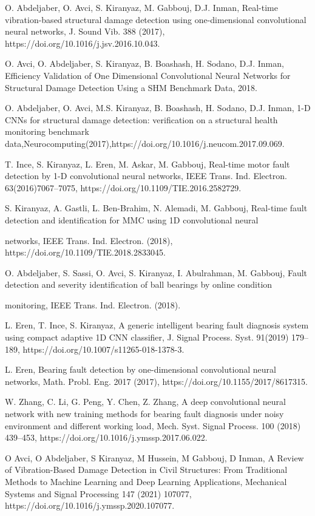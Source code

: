 \documentclass[15pt]{article}
\begin{document}
\begin{thebibliography}{99}
 O. Abdeljaber, O. Avci, S. Kiranyaz, M. Gabbouj, D.J. Inman, Real-time vibration-based structural damage detection using one-dimensional convolutional neural networks, J. Sound Vib. 388 (2017), https://doi.org/10.1016/j.jsv.2016.10.043.

 O. Avci, O. Abdeljaber, S. Kiranyaz, B. Boashash, H. Sodano, D.J. Inman, Efficiency Validation of One Dimensional Convolutional Neural Networks for Structural Damage Detection Using a SHM Benchmark Data, 2018.

 O. Abdeljaber, O. Avci, M.S. Kiranyaz, B. Boashash, H. Sodano, D.J. Inman, 1-D CNNs for structural damage detection: verification on a structural health monitoring benchmark data,Neurocomputing(2017),https://doi.org/10.1016/j.neucom.2017.09.069.

 T. Ince, S. Kiranyaz, L. Eren, M. Askar, M. Gabbouj, Real-time motor fault detection by 1-D convolutional neural networks, IEEE Trans. Ind. Electron. 63(2016)7067–7075, https://doi.org/10.1109/TIE.2016.2582729.

 S. Kiranyaz, A. Gastli, L. Ben-Brahim, N. Alemadi, M. Gabbouj, Real-time fault detection and identification for MMC using 1D convolutional neural

networks, IEEE Trans. Ind. Electron. (2018), https://doi.org/10.1109/TIE.2018.2833045.

 O. Abdeljaber, S. Sassi, O. Avci, S. Kiranyaz, I. Abulrahman, M. Gabbouj, Fault detection and severity identification of ball bearings by online condition

monitoring, IEEE Trans. Ind. Electron. (2018).

 L. Eren, T. Ince, S. Kiranyaz, A generic intelligent bearing fault diagnosis system using compact adaptive 1D CNN classifier, J. Signal Process. Syst. 91(2019) 179–189, https://doi.org/10.1007/s11265-018-1378-3.

 L. Eren, Bearing fault detection by one-dimensional convolutional neural networks, Math. Probl. Eng. 2017 (2017), https://doi.org/10.1155/2017/8617315.

 W. Zhang, C. Li, G. Peng, Y. Chen, Z. Zhang, A deep convolutional neural network with new training methods for bearing fault diagnosis under noisy environment and different working load, Mech. Syst. Signal Process. 100 (2018) 439–453, https://doi.org/10.1016/j.ymssp.2017.06.022.

 O Avci, O Abdeljaber, S Kiranyaz, M Hussein, M Gabbouj, D Inman, A Review of Vibration-Based Damage Detection in Civil Structures: From Traditional Methods to Machine Learning and Deep Learning Applications, Mechanical Systems and Signal Processing 147 (2021) 107077, https://doi.org/10.1016/j.ymssp.2020.107077.


\end{thebibliography}
\end{document}
